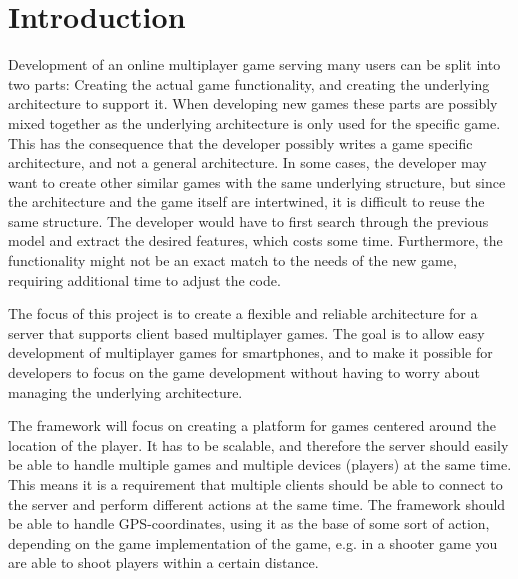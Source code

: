 \chapter{Introduction}
\label{chap:intro}




Development of an online multiplayer game serving many users can be split into two parts: Creating the actual game functionality, and creating the underlying architecture to support it. When developing new games these parts are possibly mixed together as the underlying architecture is only used for the specific game. This has the consequence that the developer possibly writes a game specific architecture, and not a general architecture. In some cases, the developer may want to create other similar games with the same underlying structure, but since the architecture and the game itself are intertwined, it is difficult to reuse the same structure. The developer would have to first search through the previous model and extract the desired features, which costs some time. Furthermore, the functionality might not be an exact match to the needs of the new game, requiring additional time to adjust the code.

The focus of this project is to create a flexible and reliable architecture for a server that supports client based multiplayer games. The goal is to allow easy development of multiplayer games for smartphones, and to make it possible for developers to focus on the game development without having to worry about managing the underlying architecture.

The framework will focus on creating a platform for games centered around the location of the player. It has to be scalable, and therefore the server should easily be able to handle multiple games and multiple devices (players) at the same time. This means it is a requirement that multiple clients should be able to connect to the server and perform different actions at the same time. The framework should be able to handle GPS-coordinates, using it as the base of some sort of action, depending on the game implementation of the game, e.g. in a shooter game you are able to shoot players within a certain distance. 

